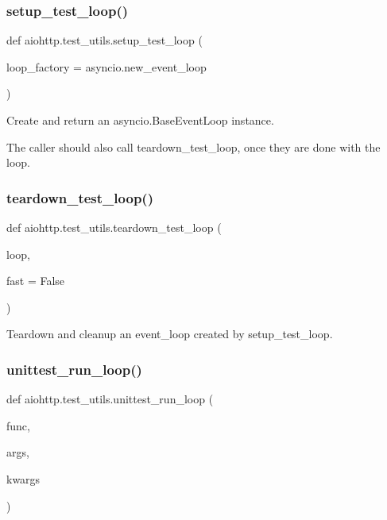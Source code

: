 \subsubsection{\texorpdfstring{setup\+\_\+test\+\_\+loop()}{setup\_test\_loop()}}
{\footnotesize\ttfamily def aiohttp.\+test\+\_\+utils.\+setup\+\_\+test\+\_\+loop (\begin{DoxyParamCaption}\item[{}]{loop\+\_\+factory = {\ttfamily asyncio.new\+\_\+event\+\_\+loop} }\end{DoxyParamCaption})}

\begin{DoxyVerb}Create and return an asyncio.BaseEventLoop
instance.

The caller should also call teardown_test_loop,
once they are done with the loop.
\end{DoxyVerb}
 \mbox{\label{namespaceaiohttp_1_1test__utils_a363c70db902f00b6b6c1e71971a8ed3b}} 
\subsubsection{\texorpdfstring{teardown\+\_\+test\+\_\+loop()}{teardown\_test\_loop()}}
{\footnotesize\ttfamily def aiohttp.\+test\+\_\+utils.\+teardown\+\_\+test\+\_\+loop (\begin{DoxyParamCaption}\item[{}]{loop,  }\item[{}]{fast = {\ttfamily False} }\end{DoxyParamCaption})}

\begin{DoxyVerb}Teardown and cleanup an event_loop created
by setup_test_loop.\end{DoxyVerb}
 \mbox{\label{namespaceaiohttp_1_1test__utils_adfdfa4b84d5dfa6d789cef9eb3dc36b7}} 
\subsubsection{\texorpdfstring{unittest\+\_\+run\+\_\+loop()}{unittest\_run\_loop()}}
{\footnotesize\ttfamily def aiohttp.\+test\+\_\+utils.\+unittest\+\_\+run\+\_\+loop (\begin{DoxyParamCaption}\item[{}]{func,  }\item[{}]{args,  }\item[{}]{kwargs }\end{DoxyParamCaption})}

